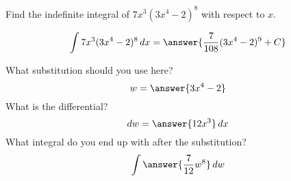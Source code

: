 \documentclass{ximera}
\author{Bobby Ramsey}
\begin{document}
\begin{exercise}

Find the indefinite integral of $7x^3(3x^4-2)^8$ with respect to $x$.

\[
\int 7x^3(3x^4-2)^8 \d x=\answer{\frac{7}{108}(3x^4-2)^9+C}	
\]
	\begin{hint}
		What substitution should you use here?
		\[ w = \answer{3x^4-2} \]
		What is the differential?
		\[ \d w = \answer{12 x^3 } \d x \]
		What integral do you end up with after the substitution?
		\[ \int \answer{\frac{7}{12} w^8} \d w \]
	\end{hint}

\end{exercise}
\end{document}
